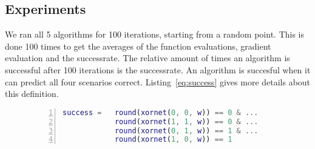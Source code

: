 \documentclass{article}
\begin{document}
\subsection{Experiments}
We ran all 5 algorithms for 100 iterations, starting from a random point. This is done 100 times to get the averages of the function evaluations, gradient evaluation and the successrate. The relative amount of times an algorithm is successful after 100 iterations is the successrate. An algorithm is succesful when it can predict all four scenarios correct. Listing~\ref{eq:success} gives more details about this definition.

\begin{figure}
	\begin{lstlisting}[caption={Success boolean of an set of weights.}, label={eq:success}, captionpos=b, language=matlab, numbers=left, tabsize=4, frame=single, basicstyle=\footnotesize, breaklines=true]
success = 	round(xornet(0, 0, w)) == 0 & ...
			round(xornet(1, 1, w)) == 0 & ... 
			round(xornet(0, 1, w)) == 1 & ...
			round(xornet(1, 0, w)) == 1
	\end{lstlisting}
\end{figure}
\end{document}
